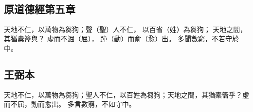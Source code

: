 ﻿%
%

\chapter{~}

\section{原道德經第五章}

\begin{withgezhu}

\zhsong


天地不仁，以萬物為芻狗；聲（\textcolor{tongjia-color}{聖}）人不仁，
\colorbox{missing-color}{以}百省（\textcolor{tongjia-color}{姓}）\colorbox{adding-color}{為芻}狗；
天地\colorbox{adding-color}{之間，其}猶橐籥與？
虛而不淈（\textcolor{tongjia-color}{屈}），
蹱（\textcolor{tongjia-color}{動}）而俞（\textcolor{tongjia-color}{愈}）出。
多聞數窮，不若守於中。

\end{withgezhu}

\section{王弼本}

\begin{withgezhu}

\zhsong

天地不仁，以萬物為芻狗；聖人不仁，以百姓為芻狗；天地之間，其猶橐籥乎？虛而不屈，動而愈出。
多言數窮，不如守中。

\end{withgezhu}
